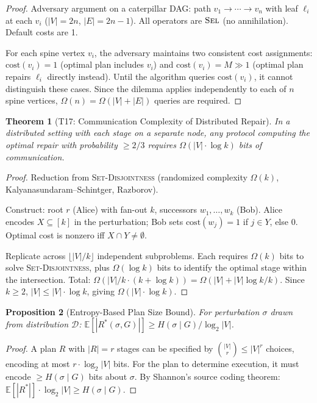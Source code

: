 \documentclass[11pt,a4paper]{article}
\newtheorem{theorem}{Theorem}[section]
\newtheorem{proposition}[theorem]{Proposition}
\theoremstyle{definition}
\newcommand{\cost}{\mathrm{cost}}
\begin{document}
\begin{proof}
Adversary argument on a caterpillar DAG: path $v_1 \to \cdots \to v_n$ with
leaf $\ell_i$ at each $v_i$ ($|V| = 2n$, $|E| = 2n-1$).  All operators are
$\textsc{Sel}$ (no annihilation).  Default costs are 1.

For each spine vertex $v_i$, the adversary maintains two consistent cost
assignments: $\cost(v_i) = 1$ (optimal plan includes $v_i$) and
$\cost(v_i) = M \gg 1$ (optimal plan repairs $\ell_i$ directly instead).
Until the algorithm queries $\cost(v_i)$, it cannot distinguish these cases.
Since the dilemma applies independently to each of $n$ spine vertices,
$\Omega(n) = \Omega(|V| + |E|)$ queries are required.
\end{proof}

\begin{theorem}[T17: Communication Complexity of Distributed Repair]%
\label{thm:comm-lower}
In a distributed setting with each stage on a separate node,
any protocol computing the optimal repair with probability $\geq 2/3$
requires $\Omega(|V| \cdot \log k)$ bits of communication.
\end{theorem}

\begin{proof}
Reduction from \textsc{Set-Disjointness} (randomized complexity $\Omega(k)$,
Kalyanasundaram--Schintger, Razborov).

Construct: root $r$ (Alice) with fan-out $k$, successors $w_1, \ldots, w_k$
(Bob).  Alice encodes $X \subseteq [k]$ in the perturbation; Bob sets
$\cost(w_j) = 1$ if $j \in Y$, else $0$.  Optimal cost is nonzero iff
$X \cap Y \neq \emptyset$.

Replicate across $\lfloor |V|/k \rfloor$ independent subproblems.  Each
requires $\Omega(k)$ bits to solve \textsc{Set-Disjointness}, plus
$\Omega(\log k)$ bits to identify the optimal stage within the intersection.
Total: $\Omega(|V|/k \cdot (k + \log k)) = \Omega(|V| + |V| \log k / k)$.
Since $k \geq 2$, $|V| \leq |V| \cdot \log k$, giving $\Omega(|V| \cdot \log k)$.
\end{proof}

\begin{proposition}[Entropy-Based Plan Size Bound]\label{prop:entropy-bound}
For perturbation $\sigma$ drawn from distribution $\mathcal{D}$:
$\mathbb{E}[|R^*(\sigma, G)|] \geq H(\sigma \mid G) / \log_2 |V|$.
\end{proposition}

\begin{proof}
A plan $R$ with $|R| = r$ stages can be specified by $\binom{|V|}{r} \leq |V|^r$
choices, encoding at most $r \cdot \log_2 |V|$ bits.  For the plan to determine
execution, it must encode $\geq H(\sigma \mid G)$ bits about $\sigma$.
By Shannon's source coding theorem:
$\mathbb{E}[|R^*|] \cdot \log_2 |V| \geq H(\sigma \mid G)$.
\end{proof}
\end{document}
